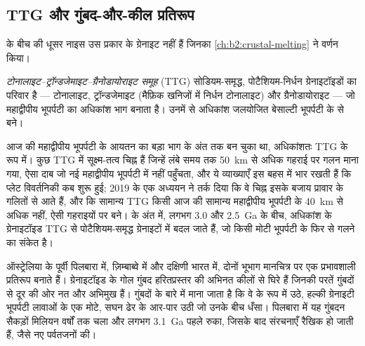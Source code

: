 \subsection*{TTG और गुंबद-और-कील प्रतिरूप}

 के बीच की धूसर नाइस उस प्रकार के ग्रेनाइट नहीं हैं जिनका
\cref{ch:b2:crustal-melting} ने वर्णन किया।

\begin{definition}[टोनालाइट--ट्रॉन्डजेमाइट--ग्रैनोडायोराइट समूह]\label{def:b2:precambrian-earth:ttg}
\emph{टोनालाइट--ट्रॉन्डजेमाइट--ग्रैनोडायोराइट समूह}
(TTG) सोडियम-समृद्ध, पोटैशियम-निर्धन ग्रेनाइटॉइडों का परिवार है --- टोनालाइट,
ट्रॉन्डजेमाइट (मैफ़िक खनिजों में निर्धन टोनालाइट) और ग्रैनोडायोराइट --- जो
 महाद्वीपीय भूपर्पटी का अधिकांश भाग बनाता है। उनमें से अधिकांश जलयोजित बेसाल्टी
भूपर्पटी के  से बने।
\end{definition}

आज की महाद्वीपीय भूपर्पटी के आयतन का बड़ा भाग  के अंत तक बन चुका था, अधिकांशतः
TTG के रूप में। कुछ TTG में सूक्ष्म-तत्व चिह्न हैं जिन्हें लंबे समय तक
\qty{50}{km} से अधिक गहराई पर गलन माना गया, ऐसा दाब जो नई महाद्वीपीय भूपर्पटी में नहीं पहुँचता, और ये व्याख्याएँ
इस बहस में भार रखती हैं कि प्लेट विवर्तनिकी कब शुरू हुई; 2019 के एक अध्ययन ने तर्क दिया कि वे चिह्न
इसके बजाय प्रावार के गलितों से आते हैं, और कि सामान्य TTG
किसी आज की सामान्य महाद्वीपीय भूपर्पटी के \qty{40}{km} से अधिक नहीं, ऐसी गहराइयों पर बने।  के अंत में,
लगभग 3.0 और \qty{2.5}{Ga} के बीच, अधिकांश  के ग्रेनाइटॉइड TTG से
पोटैशियम-समृद्ध ग्रेनाइटों में बदल जाते हैं, जो किसी मोटी भूपर्पटी के फिर से गलने का संकेत है।

ऑस्ट्रेलिया के पूर्वी पिलबारा में, ज़िम्बाब्वे में और दक्षिणी भारत में, दोनों भूभाग मानचित्र पर एक
प्रभावशाली प्रतिरूप बनाते हैं। ग्रेनाइटॉइड के गोल गुंबद हरितप्रस्तर की अभिनत कीलों से घिरे हैं जिनकी परतें गुंबदों से दूर की ओर नत और अभिमुख हैं। गुंबदों के बारे में
माना जाता है कि वे  के रूप में उठे, हल्की ग्रेनाइटी भूपर्पटी लावाओं के एक मोटे, सघन ढेर के आर-पार
उठी जो उनके बीच धँसा। पिलबारा में यह गुंबदन सैकड़ों मिलियन
वर्षों तक चला और लगभग \qty{3.1}{Ga} पहले रुका, जिसके बाद संरचनाएँ रैखिक हो जाती हैं, जैसे
नए पर्वतजनों की।

